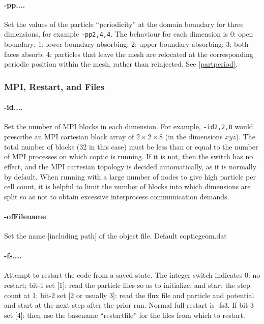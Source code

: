 \documentclass[12pt]{article}
\begin{document}
\paragraph{-pp....} Set the values of the particle ``periodicity'' at
the domain boundary for three dimensions, for example \verb!-pp2,4,4!.
The behaviour for each dimension is 0: open boundary; 1: lower
boundary absorbing; 2: upper boundary absorbing; 3: both faces absorb;
4: particles that leave the mesh are relocated at the corresponding
periodic position within the mesh, rather than reinjected. See
\ref{partperiod}.

\subsubsection*{MPI, Restart, and Files}

\paragraph{-id....} Set the number of MPI blocks in each
dimension. For example, \verb!-id2,2,8! would prescribe an MPI
cartesian block array of $2\times2\times8$ (in the dimensions $xyz$).
The total number of blocks (32 in this case) must be less than or
equal to the number of MPI processes on which coptic is running. If it
is not, then the switch has no effect, and the MPI cartesian topology
is decided automatically, as it is normally by default. When running
with a large number of nodes to give high particle per cell count, it
is helpful to limit the number of blocks into which dimensions are
split so as not to obtain excessive interprocess communication
demands.

\paragraph{-ofFilename} Set the name [including path] of the object
file. Default copticgeom.dat

\paragraph{-fs....}  Attempt to restart the code from a saved
state. The integer switch indicates 0: no restart; bit-1 set [1]: read
the particle files so as to initialize, and start the step count at 1;
bit-2 set [2 or usually 3]: read the flux file and particle and
potential and start at the next step after the prior run. Normal full
restart is -fs3. If bit-3 set [4]: then use the basename
``restartfile'' for the files from which to restart.
\end{document}
